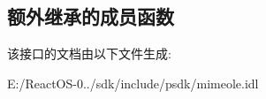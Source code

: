 \subsection*{额外继承的成员函数}


该接口的文档由以下文件生成\+:\begin{DoxyCompactItemize}
\item 
E\+:/\+React\+O\+S-\/0../sdk/include/psdk/mimeole.\+idl\end{DoxyCompactItemize}
